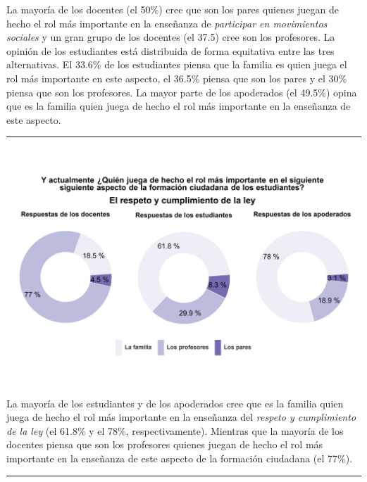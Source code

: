 \documentclass[
  14pt,
]{book}
\let\origfigure\figure
\let\endorigfigure\endfigure
\renewenvironment{figure}[1][2] {
  \expandafter\origfigure\expandafter[H]
} {
  \endorigfigure
}
\begin{document}
La mayoría de los docentes (el 50\%) cree que son los pares quienes juegan de hecho el rol más importante en la enseñanza de \emph{participar en movimientos sociales} y un gran grupo de los docentes (el 37.5) cree son los profesores. La opinión de los estudiantes está distribuida de forma equitativa entre las tres alternativas. El 33.6\% de los estudiantes piensa que la familia es quien juega el rol más importante en este aspecto, el 36.5\% piensa que son los pares y el 30\% piensa que son los profesores. La mayor parte de los apoderados (el 49.5\%) opina que es la familia quien juega de hecho el rol más importante en la enseñanza de este aspecto.

\begin{center}\rule{0.5\linewidth}{0.5pt}\end{center}

\begin{figure}[!ht]

{\centering \includegraphics[width=0.8\linewidth,]{images/graph_for_ciud11} 

}

\caption{Quién juega el rol más importante en el cumplimiento de la ley}\label{fig:unnamed-chunk-35}
\end{figure}

La mayoría de los estudiantes y de los apoderados cree que es la familia quien juega de hecho el rol más importante en la enseñanza del \emph{respeto y cumplimiento de la ley} (el 61.8\% y el 78\%, respectivamente). Mientras que la mayoría de los docentes piensa que son los profesores quienes juegan de hecho el rol más importante en la enseñanza de este aspecto de la formación ciudadana (el 77\%).

\begin{center}\rule{0.5\linewidth}{0.5pt}\end{center}
\end{document}
